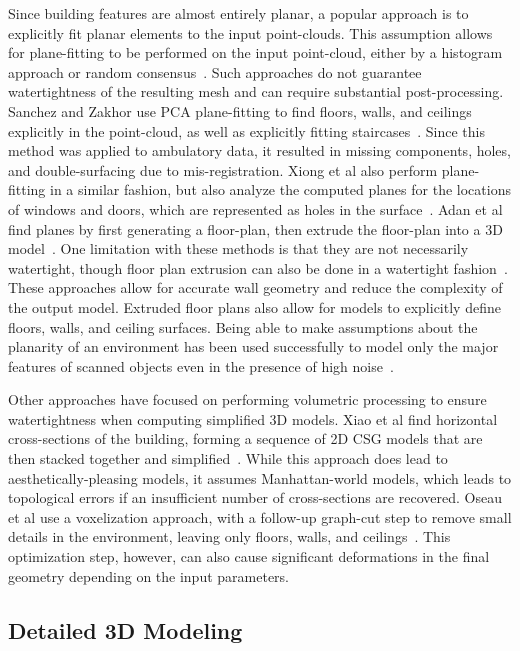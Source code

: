 \documentclass[12pt,onecolumn,oneside]{book}
\begin{document}
Since building features are almost entirely planar, a popular approach is to explicitly fit planar elements to the input point-clouds.  This assumption allows for plane-fitting to be performed on the input point-cloud, either by a histogram approach or random consensus~\cite{HistWallRecon,BasicPlaneFit}.  Such approaches do not guarantee watertightness of the resulting mesh and can require substantial post-processing.  Sanchez and Zakhor use PCA plane-fitting to find floors, walls, and ceilings explicitly in the point-cloud, as well as explicitly fitting staircases~\cite{Victors}. Since this method was applied to ambulatory data, it resulted in missing components, holes, and double-surfacing due to mis-registration.  Xiong et al also perform plane-fitting in a similar fashion, but also analyze the computed planes for the locations of windows and doors, which are represented as holes in the surface~\cite{Xiong13}.  Adan et al find planes by first generating a floor-plan, then extrude the floor-plan into a 3D model~\cite{WallFinder}.  One limitation with these methods is that they are not necessarily watertight, though floor plan extrusion can also be done in a watertight fashion~\cite{Mura14,Turner14,Cabral14}.  These approaches allow for accurate wall geometry and reduce the complexity of the output model. Extruded floor plans also allow for models to explicitly define floors, walls, and ceiling surfaces.  Being able to make assumptions about the planarity of an environment has been used successfully to model only the major features of scanned objects even in the presence of high noise~\cite{Lafarge13}.

Other approaches have focused on performing volumetric processing to ensure watertightness when computing simplified 3D models.  Xiao et al find horizontal cross-sections of the building, forming a sequence of 2D CSG models that are then stacked together and simplified~\cite{Museums}.  While this approach does lead to aesthetically-pleasing models, it assumes Manhattan-world models, which leads to topological errors if an insufficient number of cross-sections are recovered.  Oseau et al use a voxelization approach, with a follow-up graph-cut step to remove small details in the environment, leaving only floors, walls, and ceilings~\cite{Oesau13}.  This optimization step, however, can also cause significant deformations in the final geometry depending on the input parameters. 

\subsection{Detailed 3D Modeling}
\label{ssec:background_3dmodeling}
\end{document}
